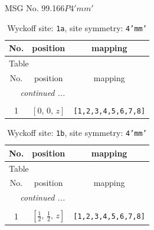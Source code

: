 \documentclass[fleqn,8pt]{jsarticle}
\begin{document}
\setcounter{MaxMatrixCols}{32}

\renewcommand{\tablename}{Table~}
\renewcommand{\figurename}{Figure~}
\begin{center}
\LARGE
MSG No. 99.166\quad$P4'mm'$
\end{center}
\renewcommand{\arraystretch}{1.2}
\begin{longtable}{ccc}
\caption{Wyckoff site: {\tt 1a}, site symmetry: {\tt 4'mm'}}
 \\
 \hline \hline
No. & position & mapping \\ \hline \endfirsthead

\multicolumn{2}{l}{\tablename\ \thetable{}} \\
 \hline \hline
No. & position & mapping \\ \hline \endhead

 \hline \hline
\multicolumn{2}{r}{\footnotesize\it continued ...} \\ \endfoot

 \hline \hline
\multicolumn{2}{r}{} \\ \endlastfoot

1 & $\left[ 0,\, 0,\, z \right]$ & {\tt [1,2,3,4,5,6,7,8]} \\
\end{longtable}
\renewcommand{\arraystretch}{1.2}
\begin{longtable}{ccc}
\caption{Wyckoff site: {\tt 1b}, site symmetry: {\tt 4'mm'}}
 \\
 \hline \hline
No. & position & mapping \\ \hline \endfirsthead

\multicolumn{2}{l}{\tablename\ \thetable{}} \\
 \hline \hline
No. & position & mapping \\ \hline \endhead

 \hline \hline
\multicolumn{2}{r}{\footnotesize\it continued ...} \\ \endfoot

 \hline \hline
\multicolumn{2}{r}{} \\ \endlastfoot

1 & $\left[ \frac{1}{2},\, \frac{1}{2},\, z \right]$ & {\tt [1,2,3,4,5,6,7,8]} \\
\end{longtable}
\renewcommand{\arraystretch}{1.2}
\end{document}
